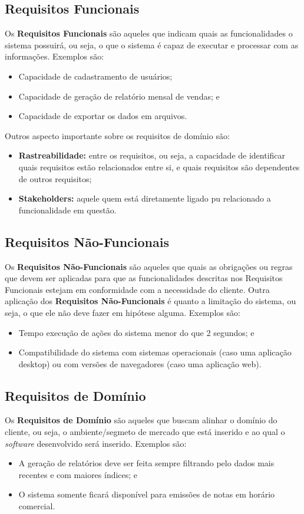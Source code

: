\documentclass[a4paper,12pt]{article}
\begin{document}
\subsection{Requisitos Funcionais}
Os \textbf{Requisitos Funcionais} são aqueles que indicam quais as funcionalidades o sistema possuirá, ou seja, o que o sistema 
é capaz de executar e processar com as informações. Exemplos são:
\begin{itemize}
	\item Capacidade de cadastramento de usuários;
	\item Capacidade de geração de relatório mensal de vendas; e
	\item Capacidade de exportar os dados em arquivos.
\end{itemize}
Outros aspecto importante sobre os requisitos de domínio são: 
\begin{itemize}
	\item\textbf{Rastreabilidade:} entre os requisitos, ou seja, a capacidade de identificar quais requisitos estão 
	relacionados entre si, e quais requisitos são dependentes de outros requisitos;
	\item\textbf{Stakeholders:} aquele quem está diretamente ligado pu relacionado a funcionalidade em questão.
\end{itemize}


\subsection{Requisitos Não-Funcionais}
Os \textbf{Requisitos Não-Funcionais} são aqueles que quais as obrigações ou regras que devem ser aplicadas para que as 
funcionalidades descritas nos Requisitos Funcionais estejam em conformidade com a necessidade do cliente.
Outra aplicação dos \textbf{Requisitos Não-Funcionais} é quanto a limitação do sistema, ou seja, o que ele não deve fazer 
em hipótese alguma. Exemplos são:
\begin{itemize}
	\item Tempo execução de ações do sistema menor do que 2 segundos; e
	\item Compatibilidade do sistema com sistemas operacionais (caso uma aplicação desktop) ou com versões de 
	navegadores (caso uma aplicação web).
\end{itemize}


\subsection{Requisitos de Domínio}
Os \textbf{Requisitos de Domínio} são aqueles que buscam alinhar o domínio do cliente, ou seja, o ambiente/segmeto de 
mercado que está inserido e ao qual o \textit{software} desenvolvido será inserido. Exemplos são:
\begin{itemize}
	\item A geração de relatórios deve ser feita sempre filtrando pelo dados mais recentes e com maiores índices; e
	\item O sistema somente ficará disponível para emissões de notas em horário comercial.
\end{itemize}
\end{document}
